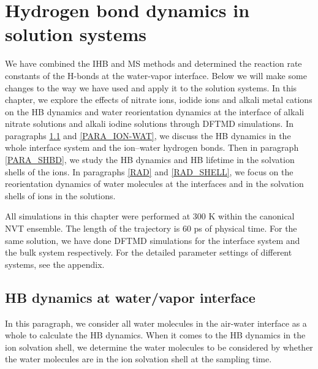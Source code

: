 \chapter{Hydrogen bond dynamics in solution systems}\label{CHAPTER_HB_SOLUTIONS}
We have combined the IHB and MS methods and determined the reaction rate constants of the H-bonds at the water-vapor interface. 
Below we will make some changes to the way we have used and apply it to the solution systems.
In this chapter, we explore the effects of nitrate ions, iodide ions and alkali metal cations 
on the HB dynamics and water reorientation dynamics at the interface of alkali nitrate solutions and alkali
iodine solutions through DFTMD simulations. %
In paragraphs \ref{HBD_ITP} and \ref{PARA_ION-WAT}, we discuss the HB dynamics in the whole interface system and the ion--water hydrogen bonds. 
Then in paragraph \ref{PARA_SHBD}, we study the HB dynamics and HB lifetime in the solvation shells of the ions.
In paragraphs \ref{RAD} and \ref{RAD_SHELL}, we focus on the reorientation dynamics of water molecules at the interfaces
and in the solvation shells of ions in the solutions.

All simulations in this chapter were performed at 300 K within the canonical NVT ensemble.
The length of the trajectory is 60 ps of physical time.
For the same solution, we have done DFTMD simulations for the interface system and the bulk system respectively. 
For the detailed parameter settings of different systems, see the appendix.


\section{HB dynamics at water/vapor interface}\label{HBD_ITP}
In this paragraph, we consider all water molecules in the air-water interface as a whole to calculate the HB dynamics. 
When it comes to the HB dynamics in the ion solvation shell, 
we determine the water molecules to be considered by whether the water molecules are in the ion solvation shell
at the sampling time.
